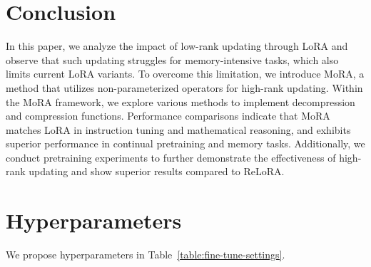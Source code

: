 \documentclass[11pt]{article}
\begin{document}
\section{Conclusion}

In this paper, we analyze the impact of low-rank updating through LoRA and observe that such updating struggles for memory-intensive tasks, which also  limits current LoRA variants. To overcome this limitation, we introduce MoRA, a method that utilizes non-parameterized operators for high-rank updating. Within the MoRA framework, we explore various methods to implement decompression and compression functions. Performance comparisons indicate that MoRA matches LoRA in instruction tuning and mathematical reasoning, and exhibits superior performance in continual pretraining and memory tasks. Additionally, we conduct pretraining experiments to further demonstrate the effectiveness of high-rank updating and show superior results compared to ReLoRA.

%


\newpage
\onecolumn
\appendix

\section{Hyperparameters}
\label{sec:train_details}

We propose hyperparameters in Table~\ref{table:fine-tune-settings}.

\end{document}
